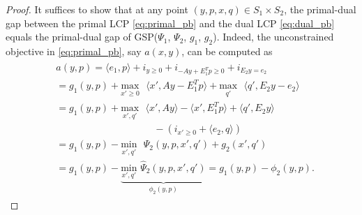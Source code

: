 \documentclass[a4paper,9pt]{extarticle}
\begin{document}
\begin{proof}
It suffices to show that at any point $(y, p, x,
q) \in S_1 \times S_2$, the primal-dual gap between the primal
LCP \eqref{eq:primal_pb} and the dual LCP \eqref{eq:dual_pb} equals
the primal-dual gap of GSP($\Psi_1$, $\Psi_2$, $g_1$, $g_2$).
Indeed, the unconstrained objective in \eqref{eq:primal_pb}, say
$a(x,y)$, can be computed as
\begin{eqnarray*}
  \begin{aligned}
    &a(y,p) = \langle e_1,p\rangle + i_{y\ge 0} + i_{-Ay + E_1^Tp \ge 0} +
    i_{E_2y = e_2}\\
    &= g_1(y,p) + \underset{x' \geq
      0}{\text{max}}\text{ }\langle x',Ay - E_1^Tp\rangle +
    \underset{q'}{\text{max}}\text{ }\langle q',E_2y - e_2\rangle\\
    &= g_1(y,p) + \underset{x',
      q'}{\text{max}}\text{ }\langle x',Ay\rangle - \langle x',
    E_1^Tp\rangle + \langle q',E_2y\rangle\\
    &\hspace{10em}-
    (i_{x' \ge 0} + \langle e_2,q\rangle)\\
    &= g_1(y,p)
      - \underset{x',q'}{\text{min}}\text{ }\Psi_2(y, p, x', q') + g_2(x',
      q')\\
      &= g_1(y,p)
      - \underbrace{\underset{x',q'}{\text{min}}\text{
        }\hat{\Psi}_2(y, p, x', q')}_{\phi_2(y,p)}
      = g_1(y, p) - \phi_2(y, p).
  \end{aligned}
  \label{eq:a}
\end{eqnarray*}


\end{proof}
\end{document}

